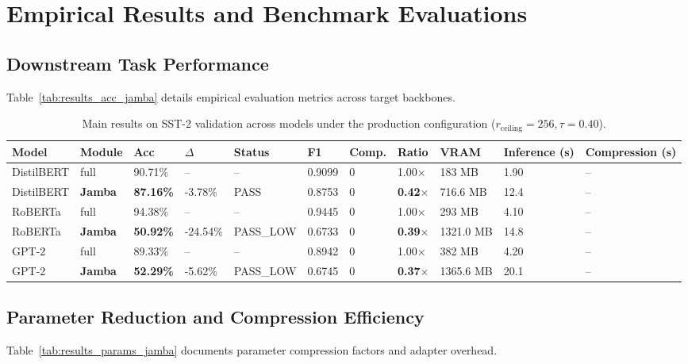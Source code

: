 \section{Empirical Results and Benchmark Evaluations}

\subsection{Downstream Task Performance}
Table~\ref{tab:results_acc_jamba} details empirical evaluation metrics across target backbones.

\begin{table}[t]
\centering
\small
\begin{tabular}{lllllllllll}
\toprule
\textbf{Model} & \textbf{Module} & \textbf{Acc} & \textbf{$\Delta$} & \textbf{Status} & \textbf{F1} & \textbf{Comp.} & \textbf{Ratio} & \textbf{VRAM} & \textbf{Inference (s)} & \textbf{Compression (s)} \\
\midrule
DistilBERT & full & 90.71\% & -- & -- & 0.9099 & 0 & 1.00$\times$ & 183 MB & 1.90 & -- \\
DistilBERT & \textbf{Jamba} & \textbf{87.16\%} & -3.78\% & PASS & 0.8753 & 0 & \textbf{0.42$\times$} & 716.6 MB & 12.4 & -- \\
RoBERTa & full & 94.38\% & -- & -- & 0.9445 & 0 & 1.00$\times$ & 293 MB & 4.10 & -- \\
RoBERTa & \textbf{Jamba} & \textbf{50.92\%} & -24.54\% & PASS_LOW & 0.6733 & 0 & \textbf{0.39$\times$} & 1321.0 MB & 14.8 & -- \\
GPT-2 & full & 89.33\% & -- & -- & 0.8942 & 0 & 1.00$\times$ & 382 MB & 4.20 & -- \\
GPT-2 & \textbf{Jamba} & \textbf{52.29\%} & -5.62\% & PASS_LOW & 0.6745 & 0 & \textbf{0.37$\times$} & 1365.6 MB & 20.1 & -- \\
\bottomrule
\end{tabular}
\caption{Main results on SST-2 validation across models under the production configuration ($r_{\mathrm{ceiling}}=256, \tau=0.40$).}
\label{tab:main_sst2}
\end{table}

\subsection{Parameter Reduction and Compression Efficiency}
Table~\ref{tab:results_params_jamba} documents parameter compression factors and adapter overhead.


